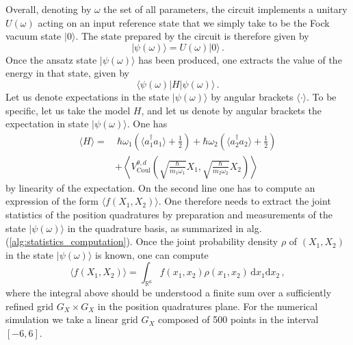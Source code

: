 \documentclass[reprint, amsmath, amssymb, floatfix, aps, pra]{revtex4-2}
\begin{document}
    Overall, denoting by $\omega$ the set of all parameters, the circuit implements a unitary $U(\omega)$ acting on an input reference state that we simply take to be the Fock vacuum state $|0\rangle$. The state prepared by the circuit is therefore given by
    \begin{equation*}
        |\psi(\omega)\rangle = U(\omega)|0\rangle\,.
    \end{equation*}
    Once the ansatz state $|\psi(\omega)\rangle$ has been produced, one extracts the value of the energy in that state, given by
    \begin{equation*}
        \langle\psi(\omega)|H|\psi(\omega)\rangle\,.
    \end{equation*}
    Let us denote expectations in the state $|\psi(\omega)\rangle$ by angular brackets $\langle\cdot\rangle$.
    To be specific, let us take the model $H$, and let us denote by angular brackets the expectation in state $|\psi(\omega)\rangle$. One has
    \begin{equation}
    \label{eq:loss}
    \begin{split}
        \langle H\rangle =&\ \hbar\omega_1\left(\langle a_{1}^\dagger a_{1}\rangle+\frac{1}{2}\right)+\hbar\omega_2\left(\langle a_{2}^\dagger a_{2}\rangle+\frac{1}{2}\right)\\
        &+ \left\langle V_\text{Coul}^{\theta, d}\left(\sqrt{\frac{\hbar}{m_1\omega_1}} X_1, \sqrt{\frac{\hbar}{m_2\omega_2}} X_2\right)\right\rangle
    \end{split}
    \end{equation}
    by linearity of the expectation. On the second line one has to compute an expression of the form $\langle f(X_1, X_2)\rangle$. One therefore needs to extract the joint statistics of the position quadratures by preparation and measurements of the state $|\psi(\omega)\rangle$ in the quadrature basis, as summarized in alg. (\ref{alg:statistics_computation}). Once the joint probability density $\rho$ of $(X_1, X_2)$ in the state $|\psi(\omega)\rangle$ is known, one can compute
    \begin{equation*}
        \langle f(X_1, X_2)\rangle = \int_{\mathbb R^{6}}f(x_1, x_2)\rho(x_1, x_2)\,\text{d}x_1\text{d}x_2\,,
    \end{equation*}
    where the integral above should be understood a finite sum over a sufficiently refined grid $G_X\times G_X$ in the position quadratures plane. For the numerical simulation we take a linear grid $G_X$ composed of 500 points in the interval $[-6,6]$.
\end{document}
